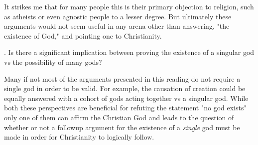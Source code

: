 \documentclass[12pt]{turabian-researchpaper}
\begin{document}
It strikes me that for many people this is their primary objection to religion, such as atheists or even agnostic people to a lesser degree. But ultimately these arguments would not seem useful in any arena other than answering, "the existence of God," and pointing one to Christianity.

. Is there a significant implication between proving the existence of a singular god vs the possibility of many gods?

Many if not most of the arguments presented in this reading do not require a single god in order to be valid. For example, the causation of creation could be equally answered with a cohort of gods acting together vs a singular god. While both these perspectives are beneficial for refuting the statement "no god exists" only one of them can affirm the Christian God and leads to the question of whether or not a followup argument for the existence of a \textit{single} god must be made in order for Christianity to logically follow.

\newpage
\printbibliography
\end{document}
